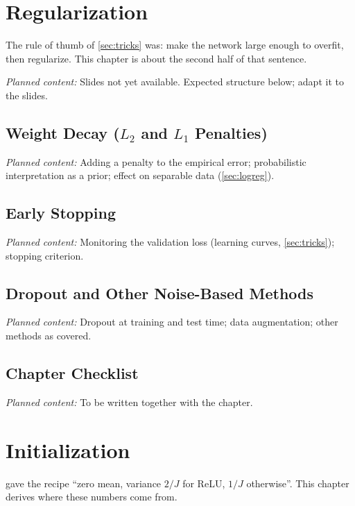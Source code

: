 \documentclass[11pt, oneside]{book}
\newcommand{\planned}[1]{%
  \par{\small\color{gray!70!black}\textit{Planned content:} #1}\par}
\let\originalsection\section
\renewcommand{\section}{\Needspace{7\baselineskip}\originalsection}
\begin{document}
\chapter{Regularization}
\label{ch:regularization}

The rule of thumb of \cref{sec:tricks} was: make the network large enough to
overfit, then regularize. This chapter is about the second half of that
sentence.

\planned{Slides not yet available. Expected structure below; adapt it to the
slides.}

\section{Weight Decay ($L_2$ and $L_1$ Penalties)}
\planned{Adding a penalty to the empirical error; probabilistic
interpretation as a prior; effect on separable data (\cref{sec:logreg}).}

\section{Early Stopping}
\planned{Monitoring the validation loss (learning curves,
\cref{sec:tricks}); stopping criterion.}

\section{Dropout and Other Noise-Based Methods}
\planned{Dropout at training and test time; data augmentation; other
methods as covered.}

\section{Chapter Checklist}
\planned{To be written together with the chapter.}


\chapter{Initialization}
\label{ch:initialization}

 gave the recipe ``zero mean, variance $2/J$ for ReLU, $1/J$
otherwise''. This chapter derives where these numbers come from.
\end{document}

